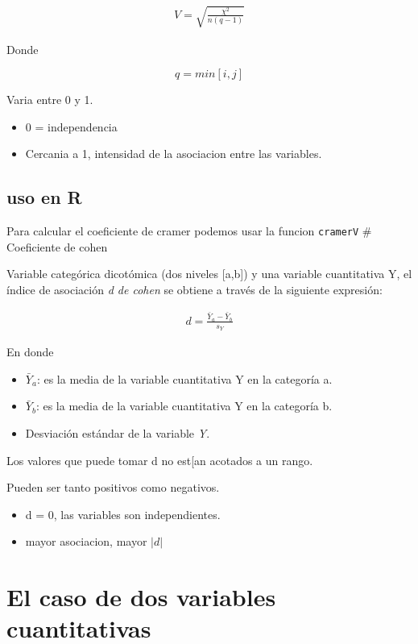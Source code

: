 \documentclass[twocolumn]{article}
\providecommand{\tightlist}{%
  \setlength{\itemsep}{0pt}\setlength{\parskip}{0pt}}
\begin{document}
\[
\begin{array}{c}
V = \sqrt{\frac{\chi^2}{n(q-1)}}
\end{array}
\]

Donde

\[
q = min[i,j]
\]

Varia entre 0 y 1.

\begin{itemize}
\tightlist
\item
  0 = independencia
\item
  Cercania a 1, intensidad de la asociacion entre las variables.
\end{itemize}

\subsection{uso en R}\label{uso-en-r}

Para calcular el coeficiente de cramer podemos usar la funcion
\texttt{cramerV} \# Coeficiente de cohen

Variable categórica dicotómica (dos niveles {[}a,b{]}) y una variable
cuantitativa Y, el índice de asociación \emph{d de cohen} se obtiene a
través de la siguiente expresión:

\[
\begin{array}{c}
d = \frac{\bar{Y}_a - \bar{Y}_b}{s_Y}
\end{array}
\]

En donde

\begin{itemize}
\tightlist
\item
  \(\bar{Y}_a\): es la media de la variable cuantitativa Y en la
  categoría a.
\item
  \(\bar{Y}_b\): es la media de la variable cuantitativa Y en la
  categoría b.
\item
  Desviación estándar de la variable \emph{Y}.
\end{itemize}

Los valores que puede tomar d no est{[}an acotados a un rango.

Pueden ser tanto positivos como negativos.

\begin{itemize}
\tightlist
\item
  d = 0, las variables son independientes.
\item
  mayor asociacion, mayor \(|d|\)
\end{itemize}

\section{El caso de dos variables
cuantitativas}\label{el-caso-de-dos-variables-cuantitativas}
\end{document}
